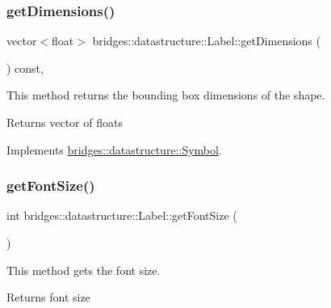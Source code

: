 \subsubsection{\texorpdfstring{get\+Dimensions()}{getDimensions()}}
{\footnotesize\ttfamily vector$<$float$>$ bridges\+::datastructure\+::\+Label\+::get\+Dimensions (\begin{DoxyParamCaption}{ }\end{DoxyParamCaption}) const\hspace{0.3cm}{\ttfamily [inline]}, {\ttfamily [virtual]}}



This method returns the bounding box dimensions of the shape. 

\begin{DoxyReturn}{Returns}
vector of floats 
\end{DoxyReturn}


Implements \hyperlink{classbridges_1_1datastructure_1_1_symbol_a5c1cb50770c4f4a2ff9c8642afc0d665}{bridges\+::datastructure\+::\+Symbol}.

\mbox{\label{classbridges_1_1datastructure_1_1_label_a200cc9710f28af2e63738d5166eaa51f}} 
\subsubsection{\texorpdfstring{get\+Font\+Size()}{getFontSize()}}
{\footnotesize\ttfamily int bridges\+::datastructure\+::\+Label\+::get\+Font\+Size (\begin{DoxyParamCaption}{ }\end{DoxyParamCaption})\hspace{0.3cm}{\ttfamily [inline]}}



This method gets the font size. 

\begin{DoxyReturn}{Returns}
font size 
\end{DoxyReturn}
\mbox{\label{classbridges_1_1datastructure_1_1_label_ac2a15e34404b9b7859e658da63a7020f}} 
